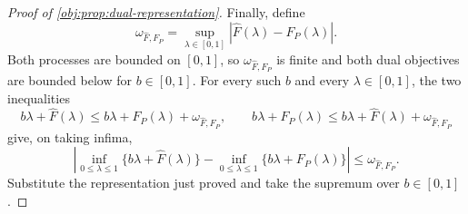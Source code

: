 \begin{proof}[Proof of \cref{obj:prop:dual-representation}]
Finally, define
\[
\omega_{\widehat F,F_P}=\sup_{\lambda\in[0,1]}|\widehat F(\lambda)-F_P(\lambda)|.
\]
Both processes are bounded on \([0,1]\), so \(\omega_{\widehat F,F_P}\) is finite and both dual objectives are bounded below for \(b\in[0,1]\). For every such \(b\) and every \(\lambda\in[0,1]\), the two inequalities
\[
b\lambda+\widehat F(\lambda)\leq b\lambda+F_P(\lambda)+\omega_{\widehat F,F_P},
\qquad
b\lambda+F_P(\lambda)\leq b\lambda+\widehat F(\lambda)+\omega_{\widehat F,F_P}
\]
give, on taking infima,
\[
\left|
\inf_{0\leq\lambda\leq1}\{b\lambda+\widehat F(\lambda)\}
-\inf_{0\leq\lambda\leq1}\{b\lambda+F_P(\lambda)\}
\right|\leq \omega_{\widehat F,F_P}.
\] %
Substitute the representation just proved and take the supremum over \(b\in[0,1]\). %
\end{proof}

